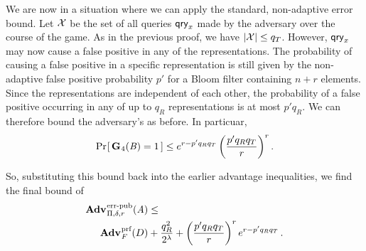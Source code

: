 We are now in a situation where we can apply the standard, non-adaptive error
bound. Let $\mathcal{X}$ be the set of all queries $\mathsf{qry}_x$ made by the adversary over
the course of the game. As in the previous proof, we have $|\mathcal{X}| \le q_T$.
However, $\mathsf{qry}_x$ may now cause a false positive in any of the representations.
The probability of causing a false positive in a specific representation is
still given by the non-adaptive false positive probability $p'$ for a Bloom
filter containing $n+r$ elements. Since the representations are independent of
each other, the probability of a false positive occurring in any of up to $q_R$
representations is at most $p'q_R$. We can therefore bound the adversary's
as before. In particuar,
\begin{equation}
   \Pr\hspace{-1pt}\left[\,\textup{\textbf{G}}\hspace{0.5pt}_4(\mathit{B})=1\,\right] \le
     e^{r-p'q_Rq_T}\left(\frac{p'q_Rq_T}{r}\right)^r.
\end{equation}

So, substituting this bound back into the earlier advantage inequalities, we find the final bound of
\begin{equation*}
  \begin{aligned}
    \Adv{\errep}_{\Pi,\delta,r}(\advA) &\leq \\
      \Adv{\prf}_F(D) &  +
    \frac{q_R^2}{2^\lambda} +
    \left(\frac{p'q_Rq_T}{r}\right)^re^{r-p'q_Rq_T} \,.
  \end{aligned}
\end{equation*}

